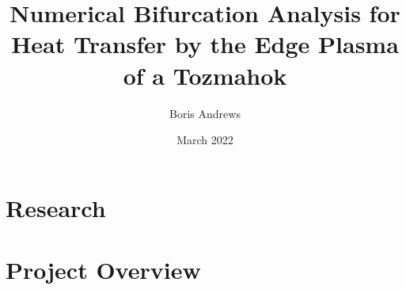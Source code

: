 \documentclass[12pt, a4paper]{report}
\title{Numerical Bifurcation Analysis for Heat Transfer by the Edge Plasma of a Tozmahok}
\author{Boris Andrews}
\affil{Mathematical Institute, University of Oxford}
\date{March 2022}
\begin{document}
    \maketitle
    
    
    
    \begin{abstract}
    \end{abstract}
    
    
    
    \newpage
    \tableofcontents
    
    
    
    \newpage
            
        \part{Research}
            
            
            
            
        \part{Project Overview}
            
            
    
    
    
    \newpage
        \printbibliography
\end{document}
